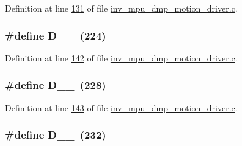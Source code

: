 Definition at line \hyperlink{inv__mpu__dmp__motion__driver_8c_source_l00131}{131} of file \hyperlink{inv__mpu__dmp__motion__driver_8c_source}{inv\+\_\+mpu\+\_\+dmp\+\_\+motion\+\_\+driver.\+c}.

\subsubsection[{\texorpdfstring{D\+\_\+0\+\_\+224}{D_0_224}}]{\setlength{\rightskip}{0pt plus 5cm}\#define D\+\_\+\_~(224)}\hypertarget{group___d_r_i_v_e_r_s_gafd5baf97b37c848b12dec9b718d27188}{}\label{group___d_r_i_v_e_r_s_gafd5baf97b37c848b12dec9b718d27188}


Definition at line \hyperlink{inv__mpu__dmp__motion__driver_8c_source_l00142}{142} of file \hyperlink{inv__mpu__dmp__motion__driver_8c_source}{inv\+\_\+mpu\+\_\+dmp\+\_\+motion\+\_\+driver.\+c}.

\subsubsection[{\texorpdfstring{D\+\_\+0\+\_\+228}{D_0_228}}]{\setlength{\rightskip}{0pt plus 5cm}\#define D\+\_\+\_~(228)}\hypertarget{group___d_r_i_v_e_r_s_ga87090eb84fc9a689a087e9f7e59cd4fb}{}\label{group___d_r_i_v_e_r_s_ga87090eb84fc9a689a087e9f7e59cd4fb}


Definition at line \hyperlink{inv__mpu__dmp__motion__driver_8c_source_l00143}{143} of file \hyperlink{inv__mpu__dmp__motion__driver_8c_source}{inv\+\_\+mpu\+\_\+dmp\+\_\+motion\+\_\+driver.\+c}.

\subsubsection[{\texorpdfstring{D\+\_\+0\+\_\+232}{D_0_232}}]{\setlength{\rightskip}{0pt plus 5cm}\#define D\+\_\+\_~(232)}\hypertarget{group___d_r_i_v_e_r_s_gafd752a244bd3eb5e07f77712d9653197}{}\label{group___d_r_i_v_e_r_s_gafd752a244bd3eb5e07f77712d9653197}


